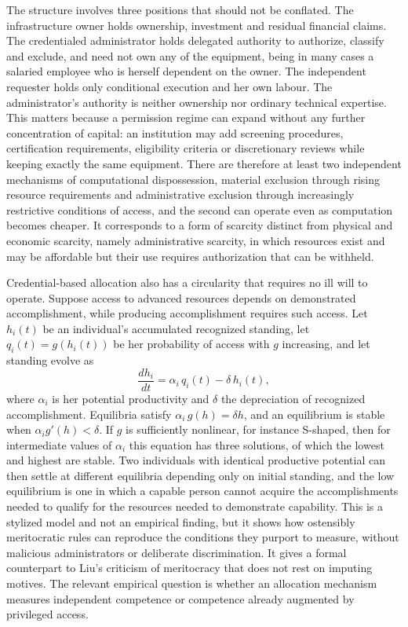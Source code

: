 \documentclass[11pt]{article}
\theoremstyle{plain}
\theoremstyle{definition}
\begin{document}
The structure involves three positions that should not be conflated. The infrastructure owner holds ownership, investment and residual financial claims. The credentialed administrator holds delegated authority to authorize, classify and exclude, and need not own any of the equipment, being in many cases a salaried employee who is herself dependent on the owner. The independent requester holds only conditional execution and her own labour. The administrator's authority is neither ownership nor ordinary technical expertise. This matters because a permission regime can expand without any further concentration of capital: an institution may add screening procedures, certification requirements, eligibility criteria or discretionary reviews while keeping exactly the same equipment. There are therefore at least two independent mechanisms of computational dispossession, material exclusion through rising resource requirements and administrative exclusion through increasingly restrictive conditions of access, and the second can operate even as computation becomes cheaper. It corresponds to a form of scarcity distinct from physical and economic scarcity, namely administrative scarcity, in which resources exist and may be affordable but their use requires authorization that can be withheld.

Credential-based allocation also has a circularity that requires no ill will to operate. Suppose access to advanced resources depends on demonstrated accomplishment, while producing accomplishment requires such access. Let $h_i(t)$ be an individual's accumulated recognized standing, let $q_i(t)=g(h_i(t))$ be her probability of access with $g$ increasing, and let standing evolve as
\[
\frac{dh_i}{dt}=\alpha_i\,q_i(t)-\delta\,h_i(t),
\]
where $\alpha_i$ is her potential productivity and $\delta$ the depreciation of recognized accomplishment. Equilibria satisfy $\alpha_i\,g(h)=\delta h$, and an equilibrium is stable when $\alpha_i g'(h)<\delta$. If $g$ is sufficiently nonlinear, for instance S-shaped, then for intermediate values of $\alpha_i$ this equation has three solutions, of which the lowest and highest are stable. Two individuals with identical productive potential can then settle at different equilibria depending only on initial standing, and the low equilibrium is one in which a capable person cannot acquire the accomplishments needed to qualify for the resources needed to demonstrate capability. This is a stylized model and not an empirical finding, but it shows how ostensibly meritocratic rules can reproduce the conditions they purport to measure, without malicious administrators or deliberate discrimination. It gives a formal counterpart to Liu's criticism of meritocracy that does not rest on imputing motives. The relevant empirical question is whether an allocation mechanism measures independent competence or competence already augmented by privileged access.
\end{document}
